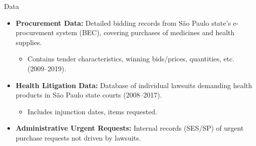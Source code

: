 \documentclass[aspectratio=169]{beamer}
\begin{document}
\begin{frame}{Data}
  \begin{itemize}
    \item \textbf{Procurement Data:} Detailed bidding records from S\~ao Paulo state's e-procurement system (BEC), covering purchases of medicines and health supplies.
          \begin{itemize}
            \item Contains tender characteristics, winning bids/prices, quantities, etc. (2009--2019).
          \end{itemize}
    \item \textbf{Health Litigation Data:} Database of individual lawsuits demanding health products in S\~ao Paulo state courts (2008--2017).
          \begin{itemize}
            \item Includes injunction dates, items requested.
          \end{itemize}
    \item \textbf{Administrative Urgent Requests:} Internal records (SES/SP) of urgent purchase requests not driven by lawsuits.
  \end{itemize}
\end{frame}
\end{document}
